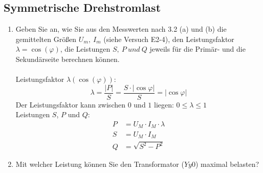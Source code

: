 \subsection{Symmetrische Drehstromlast }
\begin{enumerate}[label=\alph*)]
	\item Geben Sie an, wie Sie aus den Messwerten nach 3.2 (a) und (b) die gemittelten
	      Größen $U_m,\ I_m$ (siehe Versuch E2-4), den Leistungsfaktor
	      $\lambda=\cos(\varphi)$, die Leistungen $S,\ P\ und\ Q$ jeweils für die Primär-
	      und die Sekundärseite berechnen können.\\ \ \\ Leistungsfaktor $\lambda(\cos
			      (\varphi))$:
	      \[ \lambda = \frac{|P|}{S}=\frac{S\cdot |\cos \varphi|}{S} = |\cos \varphi| \]
	      Der Leistungsfaktor kann zwischen $0$ und $1$ liegen: $0 \leq \lambda \leq 1
	      $\\ Leistungen $S$, $P$ und $Q$:\\
	      \begin{align*}
		      P & = U_M\cdot I_M\cdot \lambda \\
		      S & = U_M\cdot I_M              \\
		      Q & = \sqrt{S^2-P^2}
	      \end{align*}

	\item Mit welcher Leistung können Sie den Transformator ($Yy0$) maximal belasten?
\end{enumerate}
